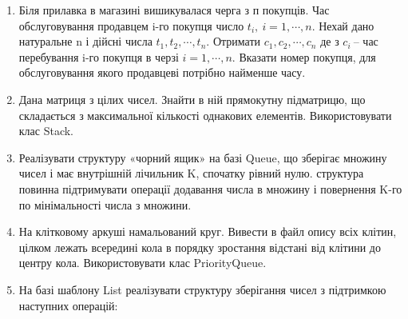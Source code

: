 \documentclass[]{article}
\makeatletter
\newcommand{\xslalph}[1]{\expandafter\@xslalph\csname c@#1\endcsname}
\newcommand{\@xslalph}[1]{%
    \ifcase#1\or а\or б\or в\or г\or д\or e\or є\or ж\or з\or i%
    \or й\or к\or л\or м\or н\or о\or п\or р\or с\or т%
    \or у\or ф\or х\or ц\or ч\or ш\or ю\or я\or аа\or бб\or вв%
    \else\@ctrerr\fi%
}
\makeatother
\begin{document}
\begin{enumerate}
\begin{enumerate}[label=\xslalph*)]
\begin{enumerate}
\begin{enumerate}[label=\xslalph*)]
\begin{enumerate}
\def\labelenumi{\arabic{enumi})}
\item
  Біля прилавка в магазині вишикувалася черга з п покупців. Час
  обслуговування продавцем i-го покупця число
  \(t_{i},\ i = 1,\cdots,n\). Нехай дано натуральне n і дійсні числа
  \(t_{1},t_{2},\cdots,t_{n}\). Отримати \(c_{1},c_{2},\cdots,c_{n}\) де
  з \(c_{i}\ \)-- час перебування i-го покупця в черзі
  \(i = 1,\cdots,n\). Вказати номер покупця, для обслуговування якого
  продавцеві потрібно найменше часу.
\item
  Дана матриця з цілих чисел. Знайти в ній прямокутну підматрицю, що
  складається з максимальної кількості однакових елементів.
  Використовувати клас Stack.
\item
  Реалізувати структуру «чорний ящик» на базі Queue, що зберігає множину
  чисел і має внутрішній лічильник K, спочатку рівний нулю. структура
  повинна підтримувати операції додавання числа в множину і повернення
  K-го по мінімальності числа з множини.
\item
  На клітковому аркуші намальований круг. Вивести в файл опису всіх
  клітин, цілком лежать всередині кола в порядку зростання відстані від
  клітини до центру кола. Використовувати клас PriorityQueue.
\item
  На базі шаблону List реалізувати структуру зберігання чисел з
  підтримкою наступних операцій:


\end{enumerate}
\end{enumerate}
\end{enumerate}
\end{enumerate}
\end{enumerate}
\end{document}
